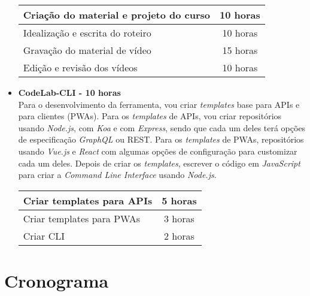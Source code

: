 \documentclass[10pt,twoside,a4paper]{article}
\begin{document}
\begin{itemize}
        \begin{center}
            \begin{tabular}{ |l|c| } 
                \hline
                     Criação do material e projeto do curso & 10 horas \\
                     \hline
                     Idealização e escrita do roteiro & 10 horas \\
                     \hline
                     Gravação do material de vídeo &  15 horas \\
                     \hline
                     Edição e revisão dos vídeos & 10 horas \\
                \hline
            \end{tabular}
        \end{center}
        
    \item \textbf{CodeLab-CLI - 10 horas} \\
        Para o desenvolvimento da ferramenta, vou criar \textit{templates} base para APIs e para clientes (PWAs). Para os \textit{templates} de APIs, vou criar repositórios usando \textit{Node.js}, com \textit{Koa} e com \textit{Express}, sendo que cada um deles terá opções de especificação \textit{GraphQL} ou REST. Para os \textit{templates} de PWAs, repositórios usando \textit{Vue.js} e \textit{React} com algumas opções de configuração para customizar cada um deles. Depois de criar os \textit{templates}, escrever o código em \textit{JavaScript} para criar a \textit{Command Line Interface} usando \textit{Node.js}.
        
        \begin{center}
            \begin{tabular}{ |l|c| } 
                \hline
                     Criar templates para APIs & 5 horas \\
                     \hline
                     Criar templates para PWAs & 3 horas \\
                     \hline
                     Criar CLI &  2 horas \\
                \hline
            \end{tabular}
        \end{center}
        
        
  \end{itemize}
  
\section{Cronograma}
\end{document}
